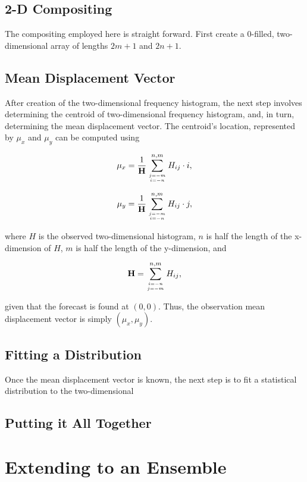 \subsection{2-D Compositing}
\label{compositing}

The compositing employed here is straight forward. First create a 0-filled, two-dimensional array of lengths $2m+1$ and $2n+1$.




\subsection{Mean Displacement Vector}
\label{displacement}

After creation of the two-dimensional frequency histogram, the next step involves determining the centroid of two-dimensional frequency histogram, and, in turn, determining the mean displacement vector. The centroid's location, represented by $\mu_x$ and $\mu_y$ can be computed using

    \begin{equation}
        \label{mux}
        \mu_x = \frac{1}{\mathbf{H}} \sum\limits_{j=-m \atop i=-n}^{n,m}H_{ij} \cdot i,
    \end{equation}

    \begin{equation}
        \label{muy}
        \mu_y = \frac{1}{\mathbf{H}} \sum\limits_{j=-m \atop i=-n}^{n,m}H_{ij} \cdot j,
    \end{equation}

\noindent where $H$ is the observed two-dimensional histogram, $n$ is half the length of the x-dimension of $H$, $m$ is half the length of the y-dimension, and

    \begin{equation}
        \mathbf{H} = \sum\limits_{i=-n \atop j=-m}^{n,m} H_{ij},
    \end{equation}

\noindent given that the forecast is found at $(0, 0)$. Thus, the observation mean displacement vector is simply $(\mu_x, \mu_y)$.




\subsection{Fitting a Distribution}
\label{fitting}

Once the mean displacement vector is known, the next step is to fit a statistical distribution to the two-dimensional




\subsection{Putting it All Together}
\label{kde}




\section{Extending to an Ensemble}
\label{emethod}
